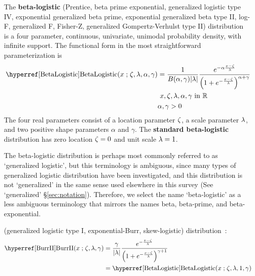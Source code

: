 


\label{sec:BetaLogistic} 
{} 
{}  



The {\bf beta-logistic } (Prentice, beta prime exponential, generalized logistic type IV, exponential generalized beta prime, exponential generalized beta type II, log-F, generalized F, Fisher-Z, generalized Gompertz-Verhulst type II) distribution~\cite{Prentice1976, McDonald1991, Johnson1995, Morton2000}
 is a four parameter, continuous, univariate, unimodal probability density, with infinite  support. The functional form in the most straightforward parameterization is
\begin{align}
\notag
\label{BetaLogistic}
\opr{BetaLogistic}(x\given  \pLoc, \pScale,\alpha,\gamma) 
& =
 \frac{1}{B(\alpha, \gamma) \Left| \pScale\Right|}
 \frac{e^{-\alpha \frac{x-\pLoc}{\pScale} }} { \Left(1 + e^{-\frac{x-\pLoc}{\pScale}  }\Right)^{\alpha+\gamma} } \checked
\\  &
\ x, \pLoc, \pScale,\alpha,\gamma \text{ in } {\mathbb R}
\\ \notag & \alpha,\gamma >0
\end{align}
The four real parameters consist of a location parameter $\zeta$, a scale parameter $\lambda$, and two positive shape parameters $\alpha$ and $\gamma$.  The {\bf standard beta-logistic} distribution has zero location $\zeta=0$ and unit scale $\lambda=1$.

The beta-logistic distribution is perhaps most commonly referred to as `generalized logistic', but this terminology is ambiguous, since many types of generalized logistic distribution have been investigated, and this distribution is not `generalized' in the same sense used elsewhere in this survey (See `generalized' \S \ref{sec:notation}). Therefore, we select the name `beta-logistic' as a less ambiguous terminology that mirrors the names beta, beta-prime, and beta-exponential.





 (generalized logistic type I, exponential-Burr, skew-logistic) distribution~\cite{Burr1942,Johnson1994}:
\begin{align}
\label{BurrII}
\opr{BurrII}(x\given \pLoc, \pScale,  \gamma) 
& = \frac{\gamma}{|\pScale|} \frac{e^{- \frac{x-\pLoc}{\pScale} } } { \Left(1 + e^{-\frac{x-\pLoc}{\pScale}  }\Right)^{\gamma+1} }
\checked
\\
& = \opr{BetaLogistic}(x\given \pLoc, \pScale, 1, \gamma) \checked
\notag
\end{align}

